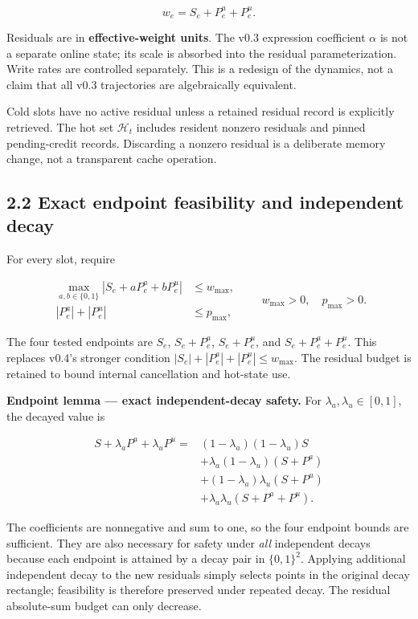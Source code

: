 \documentclass[
  11pt,
  a4paper,
]{article}
\begin{document}
\[
w_e=S_e+P_e^a+P_e^u.
\tag{3}
\]

Residuals are in \textbf{effective-weight units}. The v0.3 expression
coefficient \(\alpha\) is not a separate online state; its scale is
absorbed into the residual parameterization. Write rates are controlled
separately. This is a redesign of the dynamics, not a claim that all
v0.3 trajectories are algebraically equivalent.

Cold slots have no active residual unless a retained residual record is
explicitly retrieved. The hot set \(\mathcal H_t\) includes resident
nonzero residuals and pinned pending-credit records. Discarding a
nonzero residual is a deliberate memory change, not a transparent cache
operation.

\subsection{2.2 Exact endpoint feasibility and independent
decay}\label{exact-endpoint-feasibility-and-independent-decay}

For every slot, require

\[
\begin{aligned}
\max_{a,b\in\{0,1\}}|S_e+aP_e^a+bP_e^u|&\le w_{\max},\\
|P_e^a|+|P_e^u|&\le p_{\max},
\end{aligned}
\qquad w_{\max}>0,\quad p_{\max}>0.
\tag{4}
\]

The four tested endpoints are \(S_e\), \(S_e+P_e^a\), \(S_e+P_e^u\), and
\(S_e+P_e^a+P_e^u\). This replaces v0.4's stronger condition
\(|S_e|+|P_e^a|+|P_e^u|\le w_{\max}\). The residual budget is retained
to bound internal cancellation and hot-state use.

\textbf{Endpoint lemma --- exact independent-decay safety.} For
\(\lambda_a,\lambda_u\in[0,1]\), the decayed value is

\[
\begin{aligned}
S+\lambda_aP^a+\lambda_uP^u={}&(1-\lambda_a)(1-\lambda_u)S\\
&+\lambda_a(1-\lambda_u)(S+P^a)\\
&+(1-\lambda_a)\lambda_u(S+P^u)\\
&+\lambda_a\lambda_u(S+P^a+P^u).
\end{aligned}
\]

The coefficients are nonnegative and sum to one, so the four endpoint
bounds are sufficient. They are also necessary for safety under
\emph{all} independent decays because each endpoint is attained by a
decay pair in \(\{0,1\}^2\). Applying additional independent decay to
the new residuals simply selects points in the original decay rectangle;
feasibility is therefore preserved under repeated decay. The residual
absolute-sum budget can only decrease.
\end{document}
